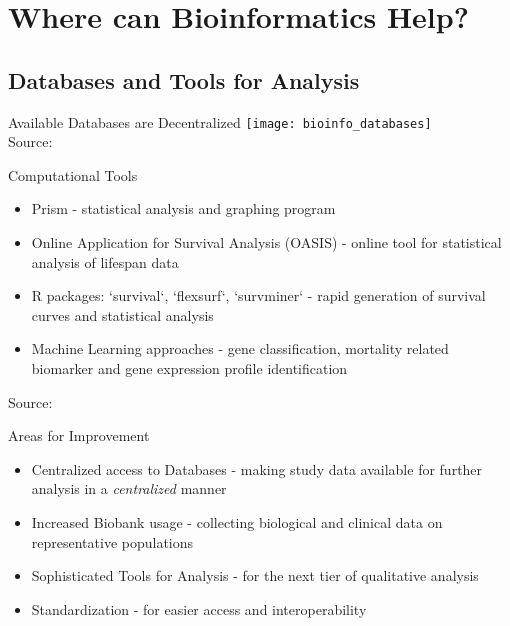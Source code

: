 \section{Where can Bioinformatics Help?}

\subsection{Databases and Tools for Analysis}

\begin{frame}[c]{Available Databases are Decentralized}
    \texttt{[image: bioinfo\_databases]} \\
    Source: \cite{kruempel2019computational}
\end{frame}


\begin{frame}[c]{Computational Tools}
    \begin{itemize}[<+(1)->]
        \item Prism - statistical analysis and graphing program
        \item Online Application for Survival Analysis (OASIS) - online tool for statistical analysis of lifespan data
        \item R packages: `survival`, `flexsurf`, `survminer` - rapid generation of survival curves and statistical analysis
        \item Machine Learning approaches - gene classification, mortality related biomarker and gene expression profile identification
    \end{itemize}
    Source: \cite{kruempel2019computational}
\end{frame}


\begin{frame}[c]{Areas for Improvement}
    \large
    \begin{itemize}[<+(1)->]
        \item Centralized access to Databases - making study data available for further analysis in a {\em centralized} manner
        \item Increased Biobank usage - collecting biological and clinical data on representative populations
        \item Sophisticated Tools for Analysis - for the next tier of qualitative analysis 
        \item Standardization - for easier access and interoperability
    \end{itemize}
\end{frame}

